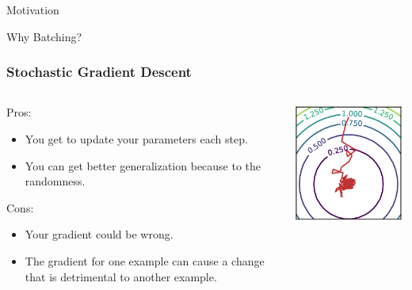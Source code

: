 \documentclass{beamer}
\begin{document}
\begin{section}{Motivation}
\begin{subsection}{Why Batching?}
        \begin{frame}
            \frametitle{Stochastic Gradient Descent}
            \begin{columns}
                \begin{column}{0.5\textwidth}
                    Pros:
                    \begin{itemize}
                        \item You get to update your parameters each step.
                        \item You can get better generalization because to the randomness.
                    \end{itemize}
                    Cons:
                    \begin{itemize}
                        \item Your gradient could be wrong.
                        \item The gradient for one example can cause a change that is detrimental to another example.
                    \end{itemize}
                \end{column}
                \begin{column}{0.5\textwidth}
                    \includegraphics[width=\textwidth]{images/sgd.png}

\end{column}
\end{columns}
\end{frame}
\end{subsection}
\end{section}
\end{document}
